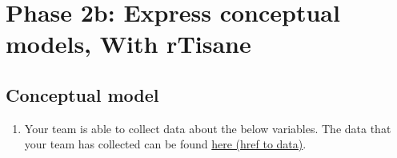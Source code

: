 \documentclass[
]{article}
\author{}
\date{\vspace{-2.5em}}
\providecommand{\tightlist}{%
  \setlength{\itemsep}{0pt}\setlength{\parskip}{0pt}}
\begin{document}
\setcounter{page}{172}

\hypertarget{conceptual-model}{%
\section{Phase 2b: Express conceptual models, With rTisane}
\subsection{Conceptual model}\label{conceptual-model}}

\begin{enumerate}
\def\labelenumi{\arabic{enumi}.}
\tightlist
\item
  Your team is able to collect data about the below variables. The data
  that your team has collected can be found
  \href{https://homes.cs.washington.edu/~emjun/income_final.csv}{here (href to data)}.
\end{enumerate}
\end{document}
